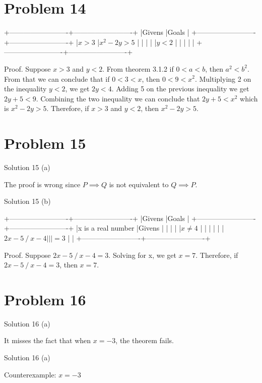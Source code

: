 \documentclass{article}
\begin{document}
\section{Problem 14}
+-------------------------+-------------------------+
|Givens                   |Goals                    |
+-------------------------+-------------------------+
|$x > 3$                  |$x^2 - 2y > 5$           |
|                         |                         |
|$y < 2$                  |                         |
|                         |                         |
+-------------------------+-------------------------+

Proof. Suppose $x > 3$ and $y < 2$. From theorem 3.1.2 if $0 < a < b$,
then $a^2 < b^2$. From that we can conclude that if  $0 < 3 < x$, then
$0 < 9 < x^2$. Multiplying 2 on the inequality $y < 2$, we get $2y <
4$. Adding 5 on the previous inequality we get $2y + 5 < 9$. Combining
the two inequality we can conclude that $2y + 5 < x^2$ which is $x^2 -
2y > 5$. Therefore, if $x > 3$ and $y < 2$, then $x^2 - 2y > 5$.

\section{Problem 15}

Solution 15 (a)

The proof is wrong since $P \implies Q$ is not equivalent to $Q
\implies P$.

Solution 15 (b)

+-------------------------+-------------------------+
|Givens                   |Goals                    |
+-------------------------+-------------------------+
|x is a real number       |Givens                   |
|                         |                         |
|$x \neq 4$               |                         |
|                         |                         |
|$2x -5 \mathbin{/} x - 4 |                         |
|= 3$                     |                         |
+-------------------------+-------------------------+

Proof. Suppose $2x -5 \mathbin{/} x - 4 = 3$. Solving for x, we get $
x = 7$. Therefore, if $2x -5 \mathbin{/} x - 4 = 3$, then $x = 7$.

\section{Problem 16}

Solution 16 (a)

It misses the fact that when $x = -3$, the theorem fails.

Solution 16 (a)

Counterexample: $x = -3$
\end{document}
